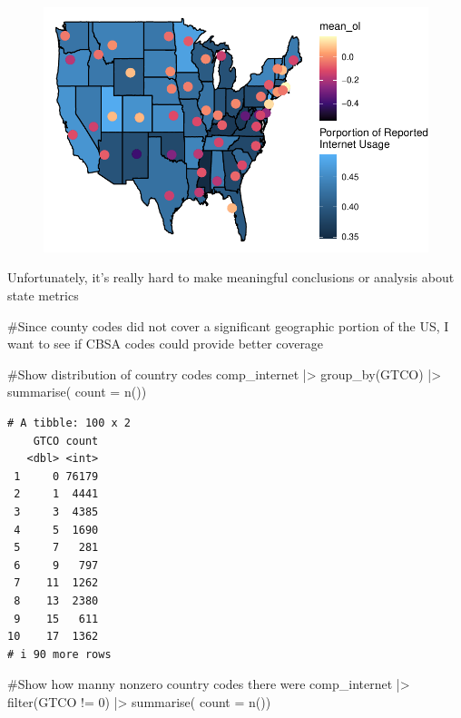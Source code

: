 \documentclass[
  letterpaper,
  DIV=11,
  numbers=noendperiod]{scrartcl}
\newenvironment{Shaded}{\begin{snugshade}}{\end{snugshade}}
\newcommand{\AttributeTok}[1]{\textcolor[rgb]{0.40,0.45,0.13}{#1}}
\newcommand{\CommentTok}[1]{\textcolor[rgb]{0.37,0.37,0.37}{#1}}
\newcommand{\DecValTok}[1]{\textcolor[rgb]{0.68,0.00,0.00}{#1}}
\newcommand{\FunctionTok}[1]{\textcolor[rgb]{0.28,0.35,0.67}{#1}}
\newcommand{\NormalTok}[1]{\textcolor[rgb]{0.00,0.23,0.31}{#1}}
\newcommand{\SpecialCharTok}[1]{\textcolor[rgb]{0.37,0.37,0.37}{#1}}
\begin{document}
\begin{figure}[H]

{\centering \includegraphics{GeospatialMapping_files/figure-pdf/bivariate-mapping-1.pdf}

}

\end{figure}

Unfortunately, it's really hard to make meaningful conclusions or
analysis about state metrics

\begin{Shaded}
\begin{Highlighting}[]
\CommentTok{\#Since county codes did not cover a significant geographic portion of the US, I want to see if CBSA codes could provide better coverage}

\CommentTok{\#Show distribution of country codes}
\NormalTok{comp\_internet }\SpecialCharTok{|\textgreater{}}
  \FunctionTok{group\_by}\NormalTok{(GTCO) }\SpecialCharTok{|\textgreater{}}
  \FunctionTok{summarise}\NormalTok{( }\AttributeTok{count =} \FunctionTok{n}\NormalTok{())}
\end{Highlighting}
\end{Shaded}

\begin{verbatim}
# A tibble: 100 x 2
    GTCO count
   <dbl> <int>
 1     0 76179
 2     1  4441
 3     3  4385
 4     5  1690
 5     7   281
 6     9   797
 7    11  1262
 8    13  2380
 9    15   611
10    17  1362
# i 90 more rows
\end{verbatim}

\begin{Shaded}
\begin{Highlighting}[]
\CommentTok{\#Show how manny nonzero country codes there were}
\NormalTok{comp\_internet }\SpecialCharTok{|\textgreater{}}
  \FunctionTok{filter}\NormalTok{(GTCO }\SpecialCharTok{!=} \DecValTok{0}\NormalTok{) }\SpecialCharTok{|\textgreater{}}
  \FunctionTok{summarise}\NormalTok{( }\AttributeTok{count =} \FunctionTok{n}\NormalTok{())}
\end{Highlighting}
\end{Shaded}
\end{document}
